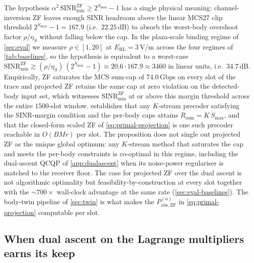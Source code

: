 \documentclass[journal,twocolumn,10pt]{IEEEtran}
\theoremstyle{plain}
\theoremstyle{remark}
\newcommand{\PabsZF}{P_{\mathrm{abs},\mathrm{ZF}}}
\begin{document}
The hypothesis $\alpha^2\,\mathrm{SINR}^{\mathrm{ZF}}_{\min} \geq
2^{S_{\max}} - 1$ has a single physical meaning: channel-inversion
ZF leaves enough SINR headroom above the linear MCS27 clip
threshold $2^{S_{\max}} - 1 = 167.9$ (i.e.\ $22.25\,$dB) to absorb
the worst-body overshoot factor $\rho/\eta_S$ without falling below
the cap. In the plaza-scale binding regime of \cref{sec:eval} we
measure $\rho \in [1, 20]$ at $E_{\mathrm{RL}} = 3\,$V/m
across the four regimes of \cref{tab:baselines}, so the hypothesis
is equivalent to a worst-case
$\mathrm{SINR}^{\mathrm{ZF}}_{\min} \gtrsim
(\rho/\eta_S)\,(2^{S_{\max}} - 1) \approx 20.6 \cdot 167.9
\approx 3460$ in linear units, i.e.\ $34.7\,$dB. Empirically, ZF
saturates the MCS sum-cap of $74.0\,$Gbps on every slot of the
trace and projected ZF retains the same cap at zero violation on
the detected-body input set, which witnesses
$\mathrm{SINR}^{\mathrm{ZF}}_{\min}$ at or above this margin
threshold across the entire $1500$-slot window.
 establishes that any $K$-stream
precoder satisfying the SINR-margin condition and the per-body
caps attains $R_{\mathrm{sum}} = K\,S_{\max}$, and that the
closed-form scaled ZF of \cref{eq:primal-projection} is one such
precoder reachable in $O(B M r)$ per slot. The proposition does
not single out projected ZF as the unique global optimum: any
$K$-stream method that saturates the cap and meets the per-body
constraints is co-optimal in this regime, including the
dual-ascent QCQP of \cref{app:dualascent} when its noise-power
regulariser is matched to the receiver floor. The case for
projected ZF over the dual ascent is not algorithmic optimality
but feasibility-by-construction at every slot together with the
$\sim 700\times$ wall-clock advantage at the same rate
(\cref{sec:eval-baselines}). The body-twin pipeline of
\cref{sec:twin} is what makes the $\PabsZF^{(u)}$ in
\cref{eq:primal-projection} computable per slot.

\subsection{When dual ascent on the Lagrange multipliers earns its keep}\label{sec:dualascent-ref}
\end{document}
